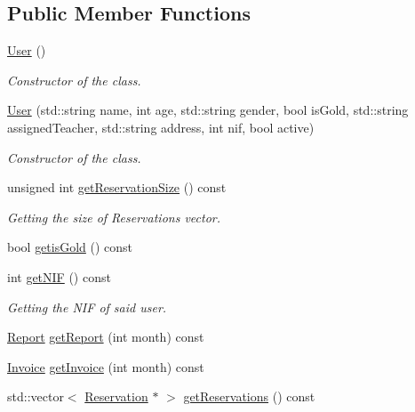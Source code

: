 \subsection*{Public Member Functions}
\begin{DoxyCompactItemize}
\item 
\mbox{\label{class_user_a4a0137053e591fbb79d9057dd7d2283d}} 
\mbox{\hyperlink{class_user_a4a0137053e591fbb79d9057dd7d2283d}{User}} ()
\begin{DoxyCompactList}\small\item\em Constructor of the class. \end{DoxyCompactList}\item 
\mbox{\hyperlink{class_user_a26dacc0c7b6de0809db02d76a81cddbf}{User}} (std\+::string name, int age, std\+::string gender, bool is\+Gold, std\+::string assigned\+Teacher, std\+::string address, int nif, bool active)
\begin{DoxyCompactList}\small\item\em Constructor of the class. \end{DoxyCompactList}\item 
unsigned int \mbox{\hyperlink{class_user_ad87b45e028489ed785fa82a4c9fc6739}{get\+Reservation\+Size}} () const
\begin{DoxyCompactList}\small\item\em Getting the size of Reservations vector. \end{DoxyCompactList}\item 
bool \mbox{\hyperlink{class_user_abd33fb93abc0209808bab9ffc6c2482c}{getis\+Gold}} () const
\item 
int \mbox{\hyperlink{class_user_a5e98c1820005dd6915bccd75bd573cea}{get\+N\+IF}} () const
\begin{DoxyCompactList}\small\item\em Getting the N\+IF of said user. \end{DoxyCompactList}\item 
\mbox{\hyperlink{class_report}{Report}} \mbox{\hyperlink{class_user_a655a16e4a6e044d973b54073cdb4bc96}{get\+Report}} (int month) const
\item 
\mbox{\hyperlink{class_invoice}{Invoice}} \mbox{\hyperlink{class_user_a82cb8a4c8f92d2a31fb2e8b0cff001f6}{get\+Invoice}} (int month) const
\item 
std\+::vector$<$ \mbox{\hyperlink{class_reservation}{Reservation}} $\ast$ $>$ \mbox{\hyperlink{class_user_a52c283b101a310a3be644bb9f8552f34}{get\+Reservations}} () const

\end{DoxyCompactItemize}
